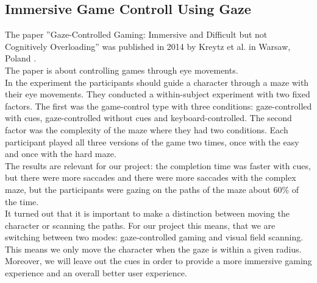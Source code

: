 \documentclass{sigchi}
\begin{document}
\subsection{Immersive Game Controll Using Gaze}
The paper ''Gaze-Controlled Gaming: Immersive and Difficult but not Cognitively Overloading'' was published in 2014 by Kreytz et al. in Warsaw, Poland \cite{krejtz2014gaze}.\\
The paper is about controlling games through eye movements.\\
In the experiment the participants should guide a character through a maze with their eye movements. They conducted a within-subject experiment with two fixed factors. The first was the game-control type with three conditions: gaze-controlled with cues, gaze-controlled without cues and keyboard-controlled. The second factor was the complexity of the maze where they had two conditions. Each participant played all three versions of the game two times, once with the easy and once with the hard maze.\\
The results are relevant for our project: the completion time was faster with cues, but there were more saccades and there were more saccades with the complex maze, but the participants were gazing on the paths of the maze about 60\% of the time.\\
It turned out that it is important to make a distinction between moving the character or scanning the paths. For our project this means, that we are switching between two modes: gaze-controlled gaming and visual field scanning. This means we only move the character when the gaze is within a given radius. Moreover, we will leave out the cues in order to provide a more immersive gaming experience and an overall better user experience.
 
\end{document}
